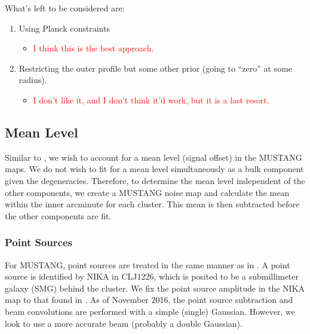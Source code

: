 \documentclass[iop,numberedappendix,apj,onecolumn]{emulateapj}
\begin{document}
What's left to be considered are:

\begin{enumerate}
  \setlength{\itemsep}{0pt}
  \setlength{\parskip}{0pt}
  \item Using Planck constraints
  \begin{itemize}
    \item \textcolor{red}{I think this is the best approach.}
  \end{itemize}
  \item Restricting the outer profile but some other prior (going to ``zero'' at some radius).
  \begin{itemize}
    \item \textcolor{red}{I don't like it, and I don't think it'd work, but it is a last resort.}
  \end{itemize}
\end{enumerate}

\newpage

\subsection{Mean Level}
\label{sec:mean_level}

Similar to \citet{czakon2015}, we wish to account for a mean level (signal offset) in the MUSTANG maps.
We do not wish to fit for a mean level simultaneously as a bulk component given the degeneracies. Therefore,
to determine the mean level independent of the other components, we create a MUSTANG noise map
and calculate the mean within the inner arcminute for each cluster. This mean is then subtracted before 
the other components are fit. 

\subsubsection{Point Sources}
\label{sec:ptsrcs}

For MUSTANG, point sources are treated in the same manner as in \citet{romero2015a}. 
A point source is identified by NIKA \citep{adam2015} in CLJ1226, which is posited to
be a submillimeter galaxy (SMG) behind the cluster. We fix the point source amplitude
in the NIKA map to that found in \citet{adam2015}. As of November 2016, the point source
subtraction and beam convolutions are performed with a simple (single) Gaussian. However,
we look to use a more accurate beam (probably a double Gaussian).
\end{document}
